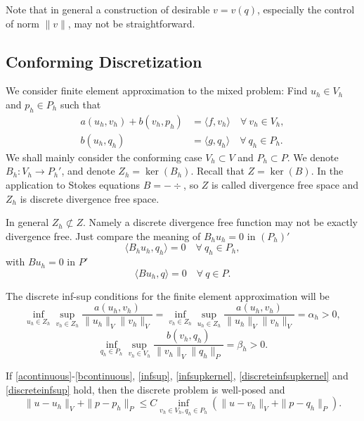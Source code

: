 Note that in general a construction of desirable $v = v(q)$, especially the control of norm
$\|v\|$, may not be straightforward.

\subsection{Conforming Discretization}
We consider finite element approximation to the mixed
problem: Find $u_h\in V_h$ and $p_h\in P_h$ such that
\begin{align}
a(u_h, v_h)+ b(v_h, p_h) & =\langle f, v_h\rangle \quad \forall~v_h\in V_h, \label{abstractmfem1}\\
b(u_h, q_h) & =\langle g, q_h\rangle  \quad \forall~q_h\in P_h.\label{abstractmfem2}
\end{align}
We shall mainly consider the conforming case $V_h\subset V$ and $P_h\subset P$. We denote $B_h:
V_h\to P_h'$, and denote $Z_h = \ker(B_h)$. Recall that $Z = \ker(B)$. In the application
to Stokes equations $B = -\div$, so $Z$ is called divergence free space and $Z_h$ is discrete
divergence free space.

\begin{remark}
In general $Z_h \not\subset Z$. Namely a discrete divergence free function may not be
exactly divergence free. Just compare the meaning of $B_hu_h = 0$ in $(P_h)'$
\[
\langle B_hu_h, q_h\rangle=0\quad\forall~q_h\in P_h,
\]
with $Bu_h=0$ in $P'$
\[
\langle Bu_h, q\rangle=0\quad\forall~q\in P.
\]
\end{remark}

The discrete inf-sup conditions for the finite element approximation will be
\begin{equation}\label{discreteinfsupkernel}
\inf_{u_h\in Z_h}\sup_{v_h\in Z_h}\frac{a(u_h, v_h)}{\|u_h\|_V\|v_h\|_V}=\inf_{v_h\in Z_h}\sup_{u_h\in Z_h}\frac{a(u_h, v_h)}{\|u_h\|_V\|v_h\|_V}=\alpha_h>0,
\end{equation}
\begin{equation}\label{discreteinfsup}
\inf_{q_h\in P_h}\sup_{v_h\in V_h}\frac{b(v_h, q_h)}{\|v_h\|_V\|q_h\|_P}=\beta_h>0.
\end{equation}

\begin{theorem}
If \eqref{acontinuous}-\eqref{bcontinuous}, \eqref{infsup}, \eqref{infsupkernel}, \eqref{discreteinfsupkernel} and \eqref{discreteinfsup} hold, then the discrete problem is well-posed and
\[
\|u-u_h\|_V+\|p-p_h\|_P\leq C\inf_{v_h\in V_h, q_h\in P_h}(\|u-v_h\|_V+\|p-q_h\|_P).
\]
\end{theorem}

